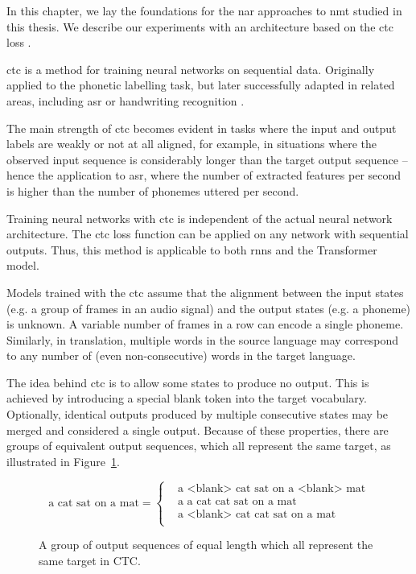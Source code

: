 \noindent
In this chapter, we lay the foundations for the \ac{nar} approaches to \ac{nmt}
studied in this thesis. We describe our experiments with an architecture based
on the \ac{ctc} loss \citep{libovicky-helcl-2018-end}.


\Ac{ctc} \citep{graves2006connectionist} is a method for training neural
networks on sequential data. Originally applied to the phonetic labelling task,
but later successfully adapted in related areas, including \ac{asr} or
handwriting recognition \citep{liwicki2007novel, eyben2009speech,
  graves2014towards}.

The main strength of \ac{ctc} becomes evident in tasks where the input and
output labels are weakly or not at all aligned, for example, in situations
where the observed input sequence is considerably longer than the target output
sequence -- hence the application to \ac{asr}, where the number of extracted
features per second is higher than the number of phonemes uttered per second.

Training neural networks with \ac{ctc} is independent of the actual neural
network architecture. The \ac{ctc} loss function can be applied on any network
with sequential outputs. Thus, this method is applicable to both \acp{rnn} and
the Transformer model.

Models trained with the \ac{ctc} assume that the alignment between the input
states (e.g. a group of frames in an audio signal) and the output states
(e.g. a phoneme) is unknown. A variable number of frames in a row can encode a
single phoneme. Similarly, in translation, multiple words in the source
language may correspond to any number of (even non-consecutive) words in the
target language.

The idea behind \ac{ctc} is to allow some states to produce no output. This is
achieved by introducing a special blank token into the target vocabulary.
Optionally, identical outputs produced by multiple consecutive states may be
merged and considered a single output. Because of these properties, there are
groups of equivalent output sequences, which all represent the same target, as
illustrated in Figure~\ref{fig:ctc-equivalent-sequences}.

\begin{figure}
  \centering
  \begin{minipage}{\textwidth}
    \begin{equation*}
        \text{a cat sat on a mat} =
        \begin{cases}
          & \text{a <blank> cat sat on a <blank> mat} \\
          & \text{a a cat cat sat on a mat} \\
          & \text{a <blank> cat cat sat on a mat} \\
        \end{cases}
    \end{equation*}
  \end{minipage}
  \caption{A group of output sequences of equal length which all represent the
    same target in CTC.} %
  \label{fig:ctc-equivalent-sequences}
\end{figure}

